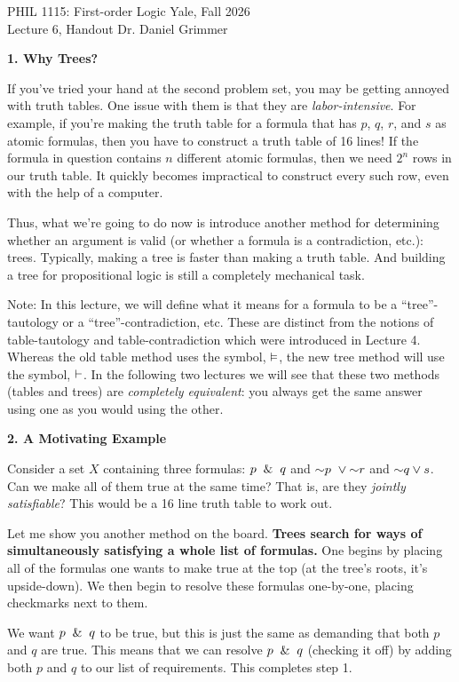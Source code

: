 \documentclass[options]{philosophersimprint}
\begin{document}
PHIL 1115: First-order Logic \hfill Yale, Fall 2026\\
Lecture 6, Handout \hfill Dr. Daniel Grimmer

\textbf{1. Why Trees?}

If you've tried your hand at the second problem set, you may be getting annoyed with truth tables. One issue with them is that they are \textit{labor-intensive}. For example, if you're making the truth table for a formula that has $p$, $q$, $r$, and $s$ as atomic formulas, then you have to construct a truth table of 16 lines! If the formula in question contains $n$ different atomic formulas, then we need $2^n$ rows in our truth table. It quickly becomes impractical to construct every such row, even with the help of a computer.

Thus, what we're going to do now is introduce another method for determining whether an argument is valid (or whether a formula is a contradiction, etc.): trees. Typically, making a tree is faster than making a truth table. And building a tree for propositional logic is still a completely mechanical task.

Note: In this lecture, we will define what it means for a formula to be a ``tree''-tautology or a ``tree''-contradiction, etc. These are distinct from the notions of table-tautology and table-contradiction which were introduced in Lecture 4. Whereas the old table method uses the symbol, $\vDash$, the new tree method will use the symbol, $\vdash$.  In the following two lectures we will see that these two methods (tables and trees) are \textit{completely equivalent}: you always get the same answer using one as you would using the other.

\textbf{2. A Motivating Example}

Consider a set $X$ containing three formulas: $p \ \mathbin{\&} \  q$ and $\mathord{\sim} p \ \mathbin{\vee} \mathord{\sim} r$ and $\mathord{\sim} q \mathbin{\vee} s$. Can we make all of them true at the same time? That is, are they \textit{jointly satisfiable}? This would be a 16 line truth table to work out.

Let me show you another method on the board. \textbf{Trees search for ways of simultaneously satisfying a whole list of formulas.} One begins by placing all of the formulas one wants to make true at the top (at the tree's roots, it's upside-down). We then begin to resolve these formulas one-by-one, placing checkmarks next to them.

We want $p \ \mathbin{\&} \  q$ to be true, but this is just the same as demanding that both $p$ and $q$ are true. This means that we can resolve $p \ \mathbin{\&} \  q$ (checking it off) by adding both $p$ and $q$ to our list of requirements. This completes step 1.
\end{document}
